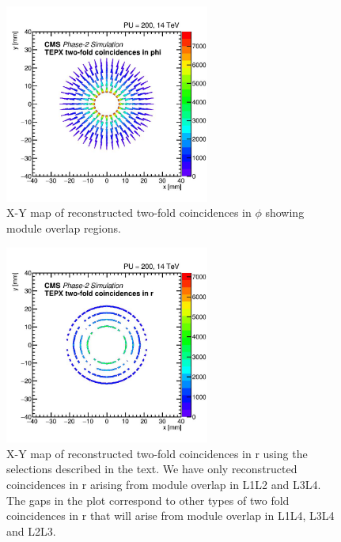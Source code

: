 \newpage

\begin{figure}[H]
\centering
\includegraphics[width=0.6\textwidth]{ashish_thesis/twofoldinphi_sch_1.png}
\caption[Map Of Two Fold Coincidences in phi]{%
   X-Y map of reconstructed two-fold coincidences in $\phi$ showing module overlap regions.
}
\label{fig:cluster_ring_720}
\end{figure}


\begin{figure}[H]
\centering
\includegraphics[width=0.6\textwidth]{ashish_thesis/l1l2_l3l4_2xinr_2.png}
\caption[L1L2 and L3L4 Module Overlap Map for Two Fold Coincidences in r]{%
   X-Y map of reconstructed two-fold coincidences in r using the selections described in the text. We have only reconstructed coincidences in r arising from module overlap in L1L2 and L3L4. The gaps in the plot correspond to other types of two fold coincidences in r that will arise from module overlap in L1L4, L3L4 and L2L3.
}
\label{fig:cluster_ring_79}
\end{figure}

